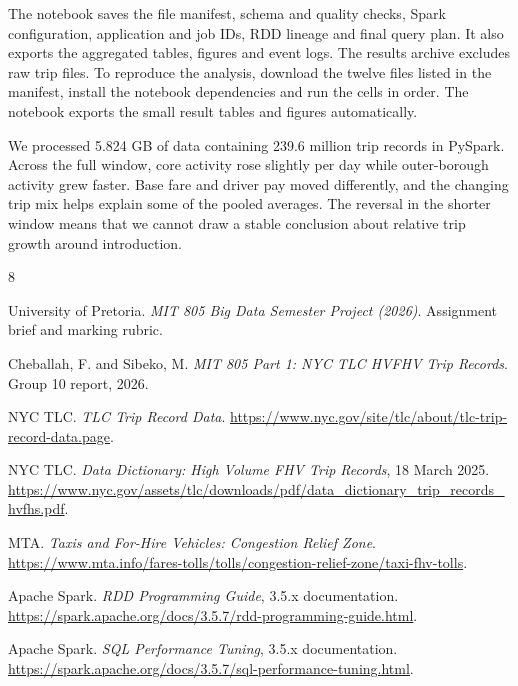 \documentclass[10pt,a4paper]{article}
\begin{document}
The notebook saves the file manifest, schema and quality checks, Spark configuration, application and job IDs, RDD lineage and final query plan. It also exports the aggregated tables, figures and event logs. The results archive excludes raw trip files. To reproduce the analysis, download the twelve files listed in the manifest, install the notebook dependencies and run the cells in order. The notebook exports the small result tables and figures automatically.

We processed 5.824 GB of data containing 239.6 million trip records in PySpark. Across the full window, core activity rose slightly per day while outer-borough activity grew faster. Base fare and driver pay moved differently, and the changing trip mix helps explain some of the pooled averages. The reversal in the shorter window means that we cannot draw a stable conclusion about relative trip growth around introduction.

\begin{thebibliography}{8}
\footnotesize
\setlength{\itemsep}{0pt}
\setlength{\parskip}{0pt}

University of Pretoria.
\emph{MIT 805 Big Data Semester Project (2026)}.
Assignment brief and marking rubric.

Cheballah, F. and Sibeko, M.
\emph{MIT 805 Part 1: NYC TLC HVFHV Trip Records}.
Group 10 report, 2026.

NYC TLC.
\emph{TLC Trip Record Data}.
\url{https://www.nyc.gov/site/tlc/about/tlc-trip-record-data.page}.

NYC TLC.
\emph{Data Dictionary: High Volume FHV Trip Records}, 18 March 2025.
\url{https://www.nyc.gov/assets/tlc/downloads/pdf/data_dictionary_trip_records_hvfhs.pdf}.

MTA.
\emph{Taxis and For-Hire Vehicles: Congestion Relief Zone}.
\url{https://www.mta.info/fares-tolls/tolls/congestion-relief-zone/taxi-fhv-tolls}.

Apache Spark.
\emph{RDD Programming Guide}, 3.5.x documentation.
\url{https://spark.apache.org/docs/3.5.7/rdd-programming-guide.html}.

Apache Spark.
\emph{SQL Performance Tuning}, 3.5.x documentation.
\url{https://spark.apache.org/docs/3.5.7/sql-performance-tuning.html}.

\end{thebibliography}
\end{document}
